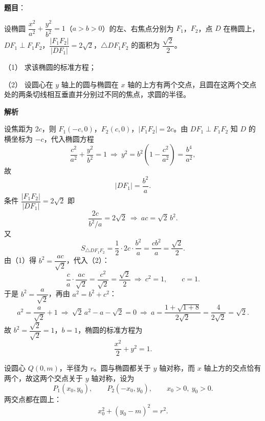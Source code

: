 \begin{answer}

\textbf{题目}：

设椭圆 $\dfrac{x^2}{a^2}+\dfrac{y^2}{b^2}=1$（$a>b>0$）的左、右焦点分别为 $F_1$，$F_2$，点 $D$ 在椭圆上，$DF_1\perp F_1F_2$，$\dfrac{|F_1F_2|}{|DF_1|}=2\sqrt2$，$\triangle DF_1F_2$ 的面积为 $\dfrac{\sqrt2}2$。
\nopagebreak[4]
\begin{center}\end{center}
\nopagebreak[4]
（1） 求该椭圆的标准方程；

（2） 设圆心在 $y$ 轴上的圆与椭圆在 $x$ 轴的上方有两个交点，且圆在这两个交点处的两条切线相互垂直并分别过不同的焦点，求圆的半径。

\textbf{解析}


设焦距为 $2c$，则 $F_1(-c,0)$，$F_2(c,0)$，$|F_1F_2|=2c$。由 $DF_1\perp F_1F_2$ 知 $D$ 的横坐标为 $-c$，代入椭圆方程
\nopagebreak[4]
\[\frac{c^2}{a^2}+\frac{y^2}{b^2}=1
\ \Longrightarrow\ y^2=b^2\left(1-\frac{c^2}{a^2}\right)=\frac{b^4}{a^2},\]
故
\nopagebreak[4]
\[|DF_1|=\frac{b^2}a .\]
条件 $\dfrac{|F_1F_2|}{|DF_1|}=2\sqrt2$ 即
\nopagebreak[4]
\[\frac{2c}{b^2/a}=2\sqrt2\ \Longrightarrow\ ac=\sqrt2\,b^2 . \tag{1}\]
又
\nopagebreak[4]
\[S_{\triangle DF_1F_2}=\frac12\cdot2c\cdot\frac{b^2}a=\frac{cb^2}a=\frac{\sqrt2}2 . \tag{2}\]
由（1）得 $b^2=\dfrac{ac}{\sqrt2}$，代入（2）：
\nopagebreak[4]
\[\frac{c}a\cdot\frac{ac}{\sqrt2}=\frac{c^2}{\sqrt2}=\frac{\sqrt2}2\ \Longrightarrow\ c^2=1,\qquad c=1 .\]
于是 $b^2=\dfrac a{\sqrt2}$，再由 $a^2=b^2+c^2$：
\nopagebreak[4]
\[a^2=\frac a{\sqrt2}+1\ \Longrightarrow\ \sqrt2\,a^2-a-\sqrt2=0
\ \Longrightarrow\ a=\frac{1+\sqrt{1+8}}{2\sqrt2}=\frac{4}{2\sqrt2}=\sqrt2 .\]
故 $b^2=\dfrac{\sqrt2}{\sqrt2}=1$，$b=1$，椭圆的标准方程为
\nopagebreak[4]
\[\frac{x^2}2+y^2=1 .\]


设圆心 $Q(0,m)$，半径为 $r$。圆与椭圆都关于 $y$ 轴对称，而 $x$ 轴上方的交点恰有两个，故这两个交点关于 $y$ 轴对称，设为
\nopagebreak[4]
\[P_1(x_0,y_0),\qquad P_2(-x_0,y_0),\qquad x_0>0,\ y_0>0 .\]
两交点都在圆上：
\nopagebreak[4]
\[x_0^2+(y_0-m)^2=r^2 . \tag{3}\]


\end{answer}

